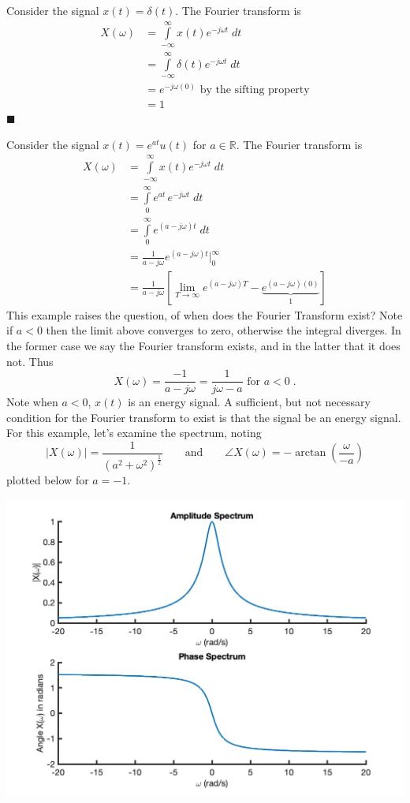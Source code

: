 \begin{example}
  Consider the signal $x(t) = \delta(t)$. The Fourier transform is
  \begin{align*}
    X(\omega) &= \int\limits_{-\infty}^{\infty} x(t) e^{-j\omega t}\; dt\\
    &= \int\limits_{-\infty}^{\infty} \delta(t) e^{-j\omega t}\; dt\\
    &= e^{-j\omega (0)} \mbox{ by the sifting property}\\
    &= 1
  \end{align*}
  $\blacksquare$
\end{example}
\begin{example}
Consider the signal $x(t) = e^{at}u(t)$ for $a\in \mathbb{R}$.  The Fourier transform is
  \begin{align*}
    X(\omega) &= \int\limits_{-\infty}^{\infty} x(t) e^{-j\omega t}\; dt\\
    &= \int\limits_{0}^{\infty}  e^{at} \, e^{-j\omega t}\; dt\\
    &= \int\limits_{0}^{\infty}  e^{(a-j\omega) t}\; dt\\
    &= \frac{1}{a-j\omega } e^{(a-j\omega) t} \Big|_{0}^{\infty}\\
    &= \frac{1}{a-j\omega } \left[ \lim_{T\rightarrow\infty} e^{(a-j\omega) T} - \underbrace{e^{(a-j\omega) (0)}}_{1}\right]
  \end{align*}
  This example raises the question, of when does the Fourier Transform exist? Note if $a < 0$ then the limit above converges to zero, otherwise the integral diverges. In the former case we say the Fourier transform exists, and in the latter that it does not. Thus
  \[
  X(\omega) = \frac{-1}{a-j\omega } = \frac{1}{j\omega-a} \mbox{ for } a < 0\;.
  \]
  Note when $a < 0$, $x(t)$ is an energy signal. A sufficient, but not necessary condition for the Fourier transform to exist is that the signal be an energy signal. For this example, let's examine the spectrum, noting
  \[
  |X(\omega)| = \frac{1}{(a^2 + \omega^2)^\frac{1}{2}} \hspace{2em}\mbox{and}\hspace{2em} \angle X(\omega) = -\arctan\left( \frac{\omega}{-a}\right)
  \]
  plotted below for $a = -1$.
  \begin{center}
\includegraphics[scale=0.6]{graphics/ctft_example1.png}

\end{center}
\end{example}
